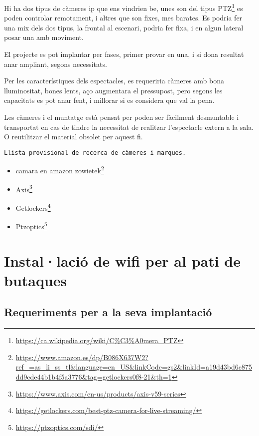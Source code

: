 \documentclass[
  10pt,
]{book}
\DeclareRobustCommand{\href}[2]{#2\footnote{\url{#1}}}
\providecommand{\tightlist}{%
  \setlength{\itemsep}{0pt}\setlength{\parskip}{0pt}}
\begin{document}
Hi ha dos tipus de càmeres ip que ens vindrien be, unes son del tipus \href{https://ca.wikipedia.org/wiki/C\%C3\%A0mera_PTZ}{PTZ} es poden controlar remotament, i altres que son fixes, mes barates. Es podria fer una mix dels dos tipus, la frontal al escenari, podria fer fixa, i en algun lateral posar una amb moviment.

El projecte es pot implantar per fases, primer provar en una, i si dona resultat anar ampliant, segons necessitats.

Per les característiques dels espectacles, es requeriria càmeres amb bona lluminositat, bones lents, aço augmentara el pressupost, pero segons les capacitats es pot anar fent, i millorar si es considera que val la pena.

Les càmeres i el muntatge està pensat per poden ser fàcilment desmuntable i transportat en cas de tindre la necessitat de realitzar l'espectacle extern a la sala. O reutilitzar el material obsolet per aquest fi.

\texttt{Llista\ provisional\ de\ recerca\ de\ càmeres\ i\ marques.}

\begin{itemize}
\tightlist
\item
  \href{https://www.amazon.es/dp/B086X637W2?ref_=as_li_ss_tl\&language=en_US\&linkCode=gs2\&linkId=a19d43bd6c875dd9cde44b1b4f5a3776\&tag=getlockers0f8-21\&th=1}{camara en amazon zowietek}
\item
  \href{https://www.axis.com/en-us/products/axis-v59-series}{Axis}
\item
  \href{https://getlockers.com/best-ptz-camera-for-live-streaming/}{Getlockers}
\item
  \href{https://ptzoptics.com/sdi/}{Ptzoptics}
\end{itemize}

\hypertarget{installaciuxf3-de-wifi-per-al-pati-de-butaques}{%
\chapter{Instal·lació de wifi per al pati de butaques}\label{installaciuxf3-de-wifi-per-al-pati-de-butaques}}

\hypertarget{requeriments-per-a-la-seva-implantaciuxf3}{%
\section{Requeriments per a la seva implantació}\label{requeriments-per-a-la-seva-implantaciuxf3}}
\end{document}
